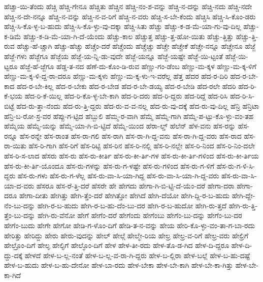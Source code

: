 {ಹೆಚ್ಚಾ-ಯಿ-ತೆಂದು
ಹೆಚ್ಚಿ
ಹೆಚ್ಚಿ-ಗೇನೂ
ಹೆಚ್ಚಿತು
ಹೆಚ್ಚಿನ
ಹೆಚ್ಚಿ-ನಂ-ಶ-ವನ್ನು
ಹೆಚ್ಚಿ-ನ-ದನ್ನು
ಹೆಚ್ಚಿ-ನದು
ಹೆಚ್ಚಿ-ನದೇ
ಹೆಚ್ಚಿ-ನ-ದೇ-ನನ್ನೂ
ಹೆಚ್ಚಿ-ನ-ವನ್ನು
ಹೆಚ್ಚಿ-ನ-ವ-ರಿಗೆ
ಹೆಚ್ಚಿ-ನ-ವರು
ಹೆಚ್ಚಿ-ಸ-ಬೇ-ಕೆಂದು
ಹೆಚ್ಚಿಸಿ
ಹೆಚ್ಚಿ-ಸಿ-ಕೊಂ-ಡರು
ಹೆಚ್ಚಿ-ಸಿ-ಕೊ-ಳ್ಳ-ಬ-ಹುದು
ಹೆಚ್ಚಿ-ಸಿ-ಕೊ-ಳ್ಳು-ವು-ದಕ್ಕಾ
ಹೆಚ್ಚಿ-ಸಿತು
ಹೆಚ್ಚು
ಹೆಚ್ಚು-ಕ-ಡ-ಮೆ-ಯಾ-ಗು-ವು-ದಿಲ್ಲ
ಹೆಚ್ಚು-ಕ-ಡಿಮೆ
ಹೆಚ್ಚು-ಕ-ಡಿ-ಮೆ-ಯಾ-ಗಿ-ದೆ-ಯೆಂದು
ಹೆಚ್ಚು-ಕಾಲ
ಹೆಚ್ಚುತ್ತ
ಹೆಚ್ಚು-ತ್ತ-ಹೋ-ಯಿತು
ಹೆಚ್ಚು-ತ್ತಿತ್ತು
ಹೆಚ್ಚು-ತ್ತಿ-ರುವ
ಹೆಚ್ಚು-ಹೆ-ಚ್ಚಾಗಿ
ಹೆಚ್ಚು-ಹೆಚ್ಚು
ಹೆಚ್ಚೆಂ-ದರೆ
ಹೆಚ್ಚೆಂದು
ಹೆಚ್ಚೆಚ್ಚು
ಹೆಚ್ಚೇ
ಹೆಚ್ಚೇಕೆ
ಹೆಚ್ಚೇ-ನನ್ನೂ
ಹೆಚ್ಚೇನೂ
ಹೆಜ್ಜೆ
ಹೆಜ್ಜೆ-ಗಳು
ಹೆಜ್ಜೆಗೂ
ಹೆಜ್ಜೆಯ
ಹೆಜ್ಜೆ-ಯ-ನ್ನಿ-ಡು-ವುದೇ
ಹೆಜ್ಜೆ-ಯನ್ನೂ
ಹೆಜ್ಜೆ-ಯಷ್ಟೇ
ಹೆಜ್ಜೆ-ಯಿ-ಟ್ಟಂತೆ
ಹೆಜ್ಜೆ-ಯಿ-ಟ್ಟರೂ
ಹೆಜ್ಜೆ-ಹೆ-ಜ್ಜೆಗೂ
ಹೆಡ್ಡ-ತ-ನದ
ಹೆಣೆ-ದು-ಕೊಂ-ಡಿ-ರುವ
ಹೆಣ್ಣು-ಗಂ-ಡೆಂಬ
ಹೆಣ್ಣು-ಮ-ಕ್ಕಳ
ಹೆಣ್ಣು-ಮ-ಕ್ಕ-ಳಿಗೆ
ಹೆಣ್ಣು-ಮ-ಕ್ಕ-ಳಿ-ದ್ದ-ರಾ-ದರೂ
ಹೆಣ್ಣು-ಮ-ಕ್ಕಳು
ಹೆಣ್ಣು-ಮ-ಕ್ಕ-ಳು-ಇ-ವರೆಲ್ಲ
ಹೆತ್ತ
ಹೆದರ
ಹೆದ-ರ-ದಿರಿ
ಹೆದ-ರ-ಬೇ-ಕಾದ
ಹೆದ-ರ-ಬೇ-ಕಿಲ್ಲ
ಹೆದ-ರ-ಬೇಕು
ಹೆದ-ರ-ಬೇಡ
ಹೆದ-ರ-ಬೇ-ಡಯ್ಯ
ಹೆದ-ರ-ಬೇಡಿ
ಹೆದ-ರಲೇ
ಹೆದರಿ
ಹೆದ-ರಿ-ಕೆ-ಭಯ
ಹೆದ-ರಿ-ಕೆ-ಯಿಲ್ಲ
ಹೆದ-ರಿ-ಕೊ-ಳ್ಳ-ಬೇ-ಕಾಗಿ
ಹೆದ-ರಿ-ದರು
ಹೆದ-ರಿ-ದ್ದರು
ಹೆದ-ರಿದ್ದೆ
ಹೆದ-ರಿಸಿ
ಹೆದ-ರಿ-ಸಿ-ಬಿಟ್ಟೆ
ಹೆದ-ರು-ತ್ತಾ-ನೆಂದು
ಹೆದ-ರು-ತ್ತಿ-ದ್ದರು
ಹೆದ-ರು-ವ-ವ-ನಲ್ಲ
ಹೆದ-ರು-ವು-ದಕ್ಕೆ
ಹೆದ-ರು-ವು-ದಿಲ್ಲ
ಹೆನ್ರಿ
ಹೆನ್ರಿಟಾ
ಹೆನ್ರಿ-ಬ-ರೋ-ಸ್ರ-ವರ
ಹೆಪ್ಪು-ಗ-ಟ್ಟಿದ
ಹೆಬ್ಬುಲಿ
ಹೆಮ್ಮ-ರ-ವಾಗಿ
ಹೆಮ್ಮೆ
ಹೆಮ್ಮೆ-ಗಾಗಿ
ಹೆಮ್ಮೆ-ಪ-ಟ್ಟು-ಕೊ-ಳ್ಳು-ವಂ-ತಹ
ಹೆಮ್ಮೆಯ
ಹೆಮ್ಮೆ-ಯನ್ನು
ಹೆಮ್ಮೆ-ಯಾ-ಗಿ-ಬಿ-ಟ್ಟಿದೆ
ಹೆಮ್ಮೆ-ಯಿಂದ
ಹೆರಾ-ಲ್ಡ್
ಹೆಲೆನ್
ಹೆಳ-ವನು
ಹೆಸ-ರನ್ನು
ಹೆಸ-ರನ್ನೂ
ಹೆಸ-ರನ್ನೇ
ಹೆಸ-ರಾಂತ
ಹೆಸ-ರಾ-ಗಲಿ
ಹೆಸ-ರಾಗಿ
ಹೆಸ-ರಾ-ಗಿ-ದ್ದ-ವನು
ಹೆಸ-ರಾ-ಗಿ-ದ್ದ-ವರು
ಹೆಸ-ರಾದ
ಹೆಸ-ರಾ-ಯಿತು
ಹೆಸ-ರಿ-ಗಾಗಿ
ಹೆಸ-ರಿಗೆ
ಹೆಸ-ರಿಟ್ಟಿ
ಹೆಸ-ರಿನ
ಹೆಸ-ರಿ-ನಲ್ಲಿ
ಹೆಸ-ರಿ-ನಲ್ಲೇ
ಹೆಸ-ರಿ-ನಿಂದ
ಹೆಸ-ರಿ-ನಿಂ-ದಲೇ
ಹೆಸ-ರಿ-ಸ-ಲಾದ
ಹೆಸರು
ಹೆಸ-ರು
ಹೆಸ-ರು-ಕೀರ್ತಿ
ಹೆಸ-ರು-ಕೀ-ರ್ತಿ-ಗಳ
ಹೆಸ-ರು-ಕೀ-ರ್ತಿ-ಗಳಿಂದ
ಹೆಸ-ರು-ಕೀ-ರ್ತಿಯ
ಹೆಸ-ರು-ಕೀ-ರ್ತಿ-ಯೊಂದೂ
ಹೆಸ-ರು-ಗಳನ್ನು
ಹೆಸ-ರು-ಗ-ಳಷ್ಟೇ
ಹೆಸ-ರು-ಗಳಿಂದ
ಹೆಸ-ರು-ಗ-ಳಿಗೆ
ಹೆಸ-ರು-ಗ-ಳಿ-ಸಿ-ದ್ದರು
ಹೆಸ-ರು-ಗಳು
ಹೆಸ-ರು-ಗ-ಳೆಲ್ಲ
ಹೆಸ-ರು-ವಾ-ಸಿ-ಯಾ-ಗಿದ್ದ
ಹೆಸ-ರು-ವಾ-ಸಿ-ಯಾ-ಗಿ-ದ್ದ-ವರು
ಹೆಸ-ರು-ವಾ-ಸಿ-ಯಾ-ದ-ವರು
ಹೆಸರೂ
ಹೆಸ-ರೆ-ತ್ತಿ-ದರೆ
ಹೆಸರೇ
ಹೇ
ಹೇಗದು
ಹೇಗಾ-ಗಿ-ಬಿ-ಟ್ಟಿ-ದೆ-ಯೆಂ-ದರೆ
ಹೇಗಾ-ದರಾ
ಹೇಗಾ-ದರೂ
ಹೇಗಾ-ದೀತು
ಹೇಗಿತ್ತು
ಹೇಗಿ-ತ್ತೆಂ-ದರೆ
ಹೇಗಿತ್ತೋ
ಹೇಗಿದೆ
ಹೇಗಿ-ದೆಯೋ
ಹೇಗಿ-ದ್ದಿ-ರ-ಬ-ಹುದು
ಹೇಗಿ-ದ್ದೇ-ನೆಂ-ಬು-ದನ್ನು
ಹೇಗಿ-ರ-ಬ-ಹುದು
ಹೇಗಿ-ರ-ಬ-ಹು-ದೆಂ-ಬು-ದರ
ಹೇಗಿ-ರ-ಬ-ಹುದೋ
ಹೇಗಿ-ರು-ತ್ತದೆ
ಹೇಗಿ-ರು-ತ್ತಿ-ತ್ತೆಂ-ಬು-ದನ್ನು
ಹೇಗಿ-ರು-ವೆನೋ
ಹೇಗೆ
ಹೇಗೆಂ-ದರೆ
ಹೇಗೆಂದು
ಹೇಗೆಂಬು
ಹೇಗೆಂ-ಬು-ದನ್ನು
ಹೇಗೆಂ-ಬು-ದರ
ಹೇಗೆಂ-ಬುದು
ಹೇಗೇ
ಹೇಗೋ
ಹೇಡಿ-ಗ-ಳೊಂ-ದಿಗೆ
ಹೇಡಿ-ತ-ನ-ವನ್ನು
ಹೇಯ
ಹೇರಿ-ಕೊ-ಳ್ಳು-ವಂ-ತಾ-ಗ-ಬಾ-ರದು
ಹೇರಿತ್ತು
ಹೇರಿದ್ದು
ಹೇರು
ಹೇರು-ವುದನ್ನು
ಹೇಲ್
ಹೇಲ್ಗೆ
ಹೇಲ್ಮೇ-ರಿಯ
ಹೇಲ್ರ
ಹೇಲ್ರ-ವ-ರಿಗೆ
ಹೇಲ್ರ-ವರು
ಹೇಲ್ರಿಗೆ
ಹೇಲ್ರೊಂ-ದಿಗೆ
ಹೇಲ್ಳ
ಹೇಲ್ಳಿಗೆ
ಹೇಲ್ಳೊಂ-ದಿಗೆ
ಹೇಳ
ಹೇಳ-ತೀ-ರದು
ಹೇಳ-ತೊ-ಡ-ಗಿದ
ಹೇಳ-ದಿ-ದ್ದರೂ
ಹೇಳ-ದಿ-ದ್ದು-ದಕ್ಕೆ
ಹೇಳದೆ
ಹೇಳ-ಬ-ಲ್ಲ-ನಂತೆ
ಹೇಳ-ಬ-ಲ್ಲ-ವ-ರಾ-ಗಿ-ದ್ದರು
ಹೇಳ-ಬ-ಲ್ಲಿರಾ
ಹೇಳ-ಬಲ್ಲೆ
ಹೇಳ-ಬ-ಹು-ದಷ್ಟೆ
ಹೇಳ-ಬ-ಹುದು
ಹೇಳ-ಬ-ಹು-ದೇನೋ
ಹೇಳ-ಬಾ-ರದು
ಹೇಳ-ಬೇಕಾ
ಹೇಳ-ಬೇ-ಕಾಗಿ
ಹೇಳ-ಬೇ-ಕಾ-ಗಿತ್ತು
ಹೇಳ-ಬೇ-ಕಾ-ಗಿದೆ
}
